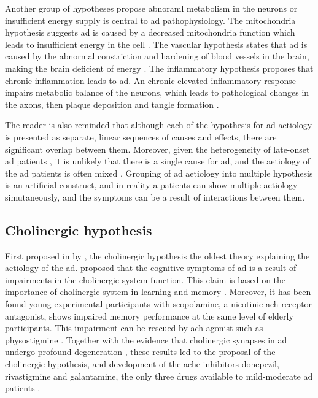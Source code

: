 Another group of hypotheses propose abnoraml metabolism in the neurons or insufficient energy supply is central to \gls{ad} pathophysiology. The mitochondria hypothesis suggests \gls{ad} is caused by a decreased mitochondria function which leads to insufficient energy in the cell \citep{zhu06a, swerdlow14}. The vascular hypothesis states that \gls{ad} is caused by the abnormal constriction and hardening of blood vessels in the brain, making the brain deficient of energy \citep{luchsinger05, mamelak17}. The inflammatory hypothesis proposes that chronic inflammation leads to \gls{ad}. An chronic elevated inflammatory response impairs metabolic balance of the neurons, which leads to pathological changes in the axons, then plaque deposition and tangle formation \citep{krstic13}. 

The reader is also reminded that although each of the hypothesis for \gls{ad} aetiology is presented as separate, linear sequences of causes and effects, there are significant overlap between them. Moreover, given the heterogeneity of late-onset \gls{ad} patients \citep{komarova11, tschanz11}, it is unlikely that there is a single cause for \gls{ad}, and the aetiology of the \gls{ad} patients is often mixed \citep{schneider07}. Grouping of \gls{ad} aetiology into multiple hypothesis is an artificial construct, and in reality a patients can show multiple aetiology simutaneously, and the symptoms can be a result of interactions between them. 

\subsection{Cholinergic hypothesis\label{ach-hypo}}
First proposed in \citeyear{bartus82} by \citeauthor{bartus82}, the cholinergic hypothesis the oldest theory explaining the aetiology of the \gls{ad}. \citet{bartus82} proposed that the cognitive symptoms of \gls{ad} is a result of impairments in the cholinergic system function. This claim is based on  the importance of cholinergic system in learning and memory \citep{deutsch71}. Moreover, it has been found young experimental participants with scopolamine, a nicotinic \gls{ach} receptor antagonist, shows impaired memory performance at the same level of elderly participants. This impairment can be rescued by \gls{ach} agonist such as physostigmine \citep{drachman74}. Together with the evidence that cholinergic synapses in \gls{ad} undergo profound degeneration \citep{whitehouse82}, these results led to the proposal of the cholinergic hypothesis, and development of the \gls{ache} inhibitors donepezil, rivastigmine and galantamine, the only three drugs available to mild-moderate \gls{ad} patients \citep[][ also see Section \ref{treatment}]{bartus00}. 

